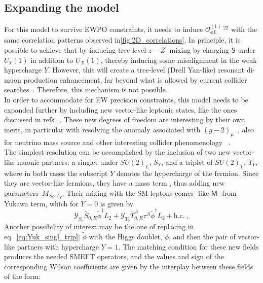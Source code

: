 \subsection{Expanding the model}
For this model to survive EWPO constraints, it needs to induce  $\mathcal O_{\phi L}^{(1)}\ ^{22}$ with the same correlation patterns observed in\autoref{fig:2D_correlations}.  In principle, it is possible to achieve that by inducing tree-level $z-Z^\prime$ mixing by charging $\mathsf{S}$ under $U_Y(1)$ in addition to $U_X(1)$, thereby inducing some misalignment in the weak hypercharge $Y$. However, this will create a tree-level (Drell Yan-like) resonant di-muon production enhancement, far beyond what is allowed by current collider searches~\cite{ATLAS-CONF-2019-001}.  Therefore, this mechanism is not possible. \\ In order to accommodate for EW precision constraints, this model needs to be expanded further by including new vector-like leptonic states, like the ones discussed in refs.~\cite{Thomas:1998wy,delAguila:2008pw}. These new degrees of freedom are interesting by their own merit, in particular with resolving the anomaly associated with $(g-2)_{\mu}$~\cite{Kannike:2011ng,Muong-2:2021ojo}, also for neutrino mass source and other interesting collider phenomenology ~\cite{Kumar:2015tna,Bhattiprolu:2019vdu}.\\ 
The simplest resolution can be accomplished by the inclusion of  two new vector-like muonic partners: a singlet under $SU(2)_{L}$, $S_{Y}$, and a triplet of $SU(2)_{L}$, $T_{Y}$, 
where in both cases the subscript $Y$ denotes the hypercharge of the fermion. Since they are vector-like fermions, they have a mass term , thus adding new parameters~$M_{S_{Y},T_{Y}}$. Their mixing with the SM leptons comes -like $\mathsf{M}$- from Yukawa term, which for $Y=0$ is given by
\begin{equation}
	\label{eq:Yuk_singl_tripl}
	\mathcal{Y}_{S_{0}} \bar{S}_{0,R} \tilde{\phi}^{\dagger} L_{2} + \mathcal{Y}_{T_{0}} \bar{T}^{A}_{0,R} \tau^{A} \tilde{\phi}^{\dagger} L_{2} + \textrm{h.c.}  \ ,
\end{equation} 
Another possibility of interest may be the one of replacing in eq.~\eqref{eq:Yuk_singl_tripl} $\tilde{\phi} $
with the Higgs doublet, $\phi$, and then the pair of vector-like partners with hypercharge $Y=1$.  The matching condition for these new fields produces the needed SMEFT operators, and the values and sign of the corresponding Wilson coefficients are given by the interplay between these fields ~\cite{delAguila:2008pw,Kannike:2011ng} of the form:

